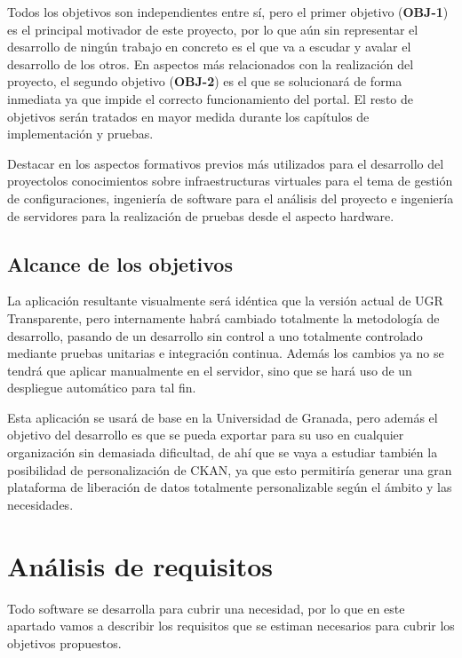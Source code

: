 Todos los objetivos son independientes entre sí, pero el primer objetivo (\textbf{OBJ-1}) es el principal motivador de este 
proyecto, por lo que aún sin representar el desarrollo de ningún trabajo en concreto es el que va a escudar y avalar el 
desarrollo de los otros. En aspectos más relacionados con la realización del proyecto, el segundo objetivo (\textbf{OBJ-2}) es
el que se solucionará de forma inmediata ya que impide el correcto funcionamiento del portal. El resto de objetivos serán 
tratados en mayor medida durante los capítulos de implementación y pruebas.

\bigskip
Destacar en los aspectos formativos previos más utilizados para el desarrollo del proyectolos conocimientos sobre 
infraestructuras virtuales para el tema de gestión de configuraciones, ingeniería de software para el análisis del proyecto 
e ingeniería de servidores para la realización de pruebas desde el aspecto hardware.

\subsection{Alcance de los objetivos}

La aplicación resultante visualmente será idéntica que la versión actual de UGR Transparente, pero internamente habrá cambiado
totalmente la metodología de desarrollo, pasando de un desarrollo sin control a uno totalmente controlado mediante pruebas 
unitarias e integración continua. Además los cambios ya no se tendrá que aplicar manualmente en el servidor, sino que se hará
uso de un despliegue automático para tal fin.

\bigskip
Esta aplicación se usará de base en la Universidad de Granada, pero además el objetivo del desarrollo es que se pueda exportar 
para su uso en cualquier organización sin demasiada dificultad, de ahí que se vaya a estudiar también la posibilidad de 
personalización de CKAN, ya que esto permitiría generar una gran plataforma de liberación de datos totalmente personalizable
según el ámbito y las necesidades.

\section{Análisis de requisitos}

Todo software se desarrolla para cubrir una necesidad, por lo que en este apartado vamos a describir los requisitos que se 
estiman necesarios para cubrir los objetivos propuestos.

